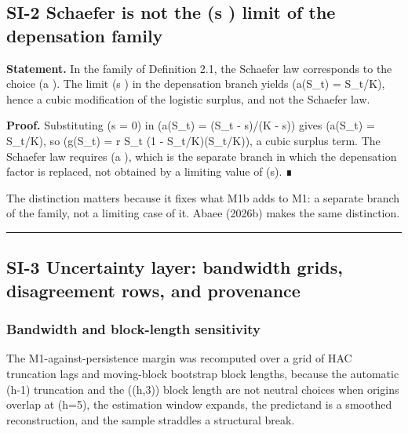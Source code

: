 \documentclass[11pt]{article}
\begin{document}
\subsection{\texorpdfstring{SI-2 Schaefer is not the (\mathfrak s )
limit of the depensation
family}{SI-2 Schaefer is not the (s ) limit of the depensation family}}\label{si-2-schaefer-is-not-the-s-limit-of-the-depensation-family}

\textbf{Statement.} In the family of Definition 2.1, the Schaefer law
corresponds to the choice (a ). The limit (\mathfrak s ) in
the depensation branch yields (a(S\_t) = S\_t/K), hence a cubic
modification of the logistic surplus, and not the Schaefer law.

\textbf{Proof.} Substituting (\mathfrak s = 0) in (a(S\_t) = (S\_t -
\mathfrak s)/(K - \mathfrak s)) gives (a(S\_t) = S\_t/K), so (g(S\_t) =
r S\_t (1 - S\_t/K)\cdot(S\_t/K)), a cubic surplus term. The Schaefer
law requires (a ), which is the separate branch in which the
depensation factor is replaced, not obtained by a limiting value of
(\mathfrak s). ∎

The distinction matters because it fixes what M1b adds to M1: a separate
branch of the family, not a limiting case of it. Abaee (2026b) makes the
same distinction.

\begin{center}\rule{0.5\linewidth}{0.5pt}\end{center}

\subsection{SI-3 Uncertainty layer: bandwidth grids, disagreement rows,
and
provenance}\label{si-3-uncertainty-layer-bandwidth-grids-disagreement-rows-and-provenance}

\subsubsection{Bandwidth and block-length
sensitivity}\label{bandwidth-and-block-length-sensitivity}

The M1-against-persistence margin was recomputed over a grid of HAC
truncation lags and moving-block bootstrap block lengths, because the
automatic (h-1) truncation and the (\max(h,3)) block length are not
neutral choices when origins overlap at (h=5), the estimation window
expands, the predictand is a smoothed reconstruction, and the sample
straddles a structural break.
\end{document}
